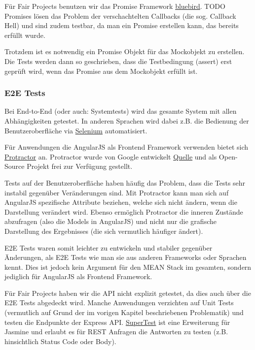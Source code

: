 Für Fair Projects benutzen wir das Promise Framework
\href{http://bluebirdjs.com/}{bluebird}. TODO Promises lösen das Problem
der verschachtelten Callbacks (die sog. Callback Hell) und sind zudem
testbar, da man ein Promise erstellen kann, das bereits erfüllt wurde.

Trotzdem ist es notwendig ein Promise Objekt für das Mockobjekt zu
erstellen. Die Tests werden dann so geschrieben, dass die Testbedingung
(assert) erst geprüft wird, wenn das Promise aus dem Mockobjekt erfüllt
ist.

\subsubsection{E2E Tests}\label{e2e-tests}

Bei End-to-End (oder auch: Systemtests) wird das gesamte System mit
allen Abhängigkeiten getestet. In anderen Sprachen wird dabei z.B. die
Bedienung der Benutzeroberfläche via
\href{http://www.seleniumhq.org/}{Selenium} automatisiert.

Für Anwendungen die AngularJS als Frontend Framework verwenden bietet
sich \href{http://www.protractortest.org/}{Protractor} an. Protractor
wurde von Google entwickelt
\href{http://googletesting.blogspot.de/2014/11/protractor-angular-testing-made-easy.html}{Quelle}
und als Open-Source Projekt frei zur Verfügung gestellt.

Tests auf der Benutzeroberfläche haben häufig das Problem, dass die
Tests sehr instabil gegenüber Veränderungen sind. Mit Protractor kann
man sich auf AngularJS spezifische Attribute beziehen, welche sich nicht
ändern, wenn die Darstellung verändert wird. Ebenso ermöglich Protractor
die inneren Zustände abzufragen (also die Models in AngularJS) und nicht
nur die grafische Darstellung des Ergebnisses (die sich vermutlich
häufiger ändert).

E2E Tests waren somit leichter zu entwickeln und stabiler gegenüber
Änderungen, als E2E Tests wie man sie aus anderen Frameworks oder
Sprachen kennt. Dies ist jedoch kein Argument für den MEAN Stack im
gesamten, sondern jediglich für AngularJS als Frontend Framework.

Für Fair Projects haben wir die API nicht explizit getestet, da dies
auch über die E2E Tests abgedeckt wird. Manche Anwendungen verzichten
auf Unit Tests (vermutlich auf Grund der im vorigen Kapitel
beschriebenen Problematik) und testen die Endpunkte der Express API.
\href{https://github.com/visionmedia/supertest}{SuperTest} ist eine
Erweiterung für Jasmine und erlaubt es für REST Anfragen die Antworten
zu testen (z.B. hinsichtlich Status Code oder Body).

